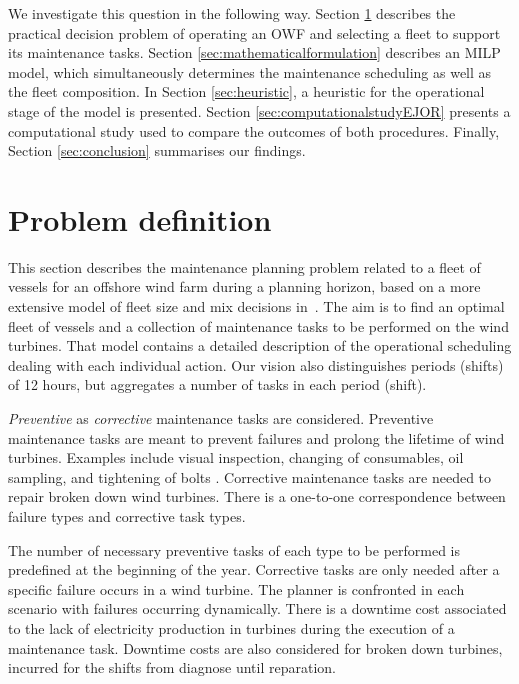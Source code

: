 We investigate this question in the following way. Section \ref{sec:problemdescriptionEJOR} describes the practical decision problem of operating an OWF and selecting a fleet to support its maintenance tasks. Section \ref{sec:mathematicalformulation} describes an MILP model, which simultaneously determines the maintenance scheduling as well as the fleet composition. In Section \ref{sec:heuristic}, a heuristic for the operational stage of the model is presented. Section \ref{sec:computationalstudyEJOR} presents a computational study used to compare the outcomes of both procedures. Finally, Section \ref{sec:conclusion} summarises our findings.


\section{Problem definition}
\label{sec:problemdescriptionEJOR}

This section describes the maintenance planning problem related to a fleet of vessels for an offshore wind farm during a planning horizon, based on a more extensive model of fleet size and mix decisions in~\cite{Elin}. The aim is to find an optimal fleet of vessels and a collection of maintenance tasks to be performed on the wind turbines. That model contains a detailed description of the operational scheduling dealing with each individual action. Our vision also distinguishes  periods (shifts) of 12 hours, but aggregates a number of tasks in each period (shift).


\emph{Preventive} as \emph{corrective} maintenance tasks are considered.
Preventive maintenance tasks are meant to prevent failures and prolong the lifetime of wind turbines. Examples include visual inspection, changing of consumables, oil sampling, and tightening of bolts \cite{obdam}. Corrective maintenance tasks are needed to repair broken down wind turbines. There is a one-to-one correspondence between failure types and corrective task types.


The number of necessary preventive tasks of each type to be performed is predefined at the beginning of the year. Corrective tasks are only needed after a specific failure occurs in a wind turbine. The planner is confronted in each scenario with failures occurring dynamically. There is a downtime cost associated to the lack of electricity production in turbines during the execution of a maintenance task. Downtime costs are also considered for broken down turbines, incurred for the shifts from diagnose until reparation.




